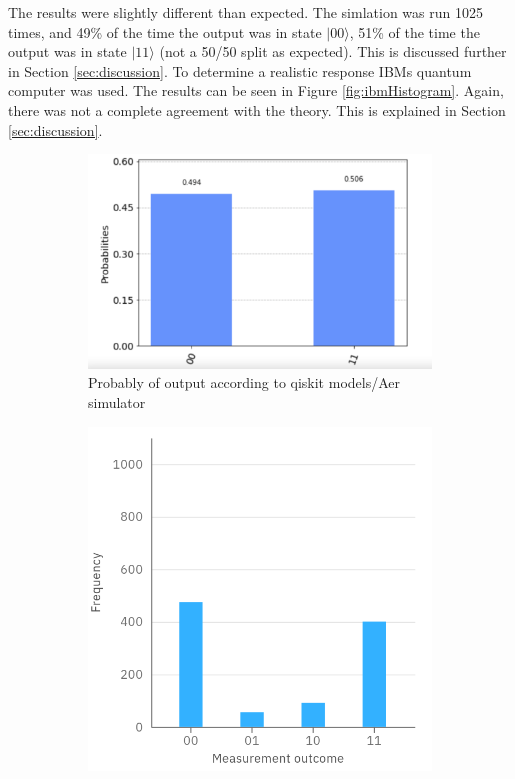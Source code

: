 The results were slightly different than expected. The simlation was run 1025 times, and 49\% of the time the output was in state $|00\rangle$, 51\% of the time the output was in state $|11\rangle$ (not a 50/50 split as expected). This is discussed further in Section \ref{sec:discussion}. To determine a realistic response IBMs quantum computer was used. The results can be seen in Figure \ref{fig:ibmHistogram}. Again, there was not a complete agreement with the theory. This is explained in Section \ref{sec:discussion}.

\begin{figure}[h]
    \centering
    \begin{subfigure}[h]{0.5\textwidth}
        \includegraphics[width=\textwidth]{lab2/images/qiskitHistogram.png}
        \caption{Probably of output according to qiskit models/Aer simulator} 
        \label{fig:qiskitHistogram}
    \end{subfigure}
    \hfill
    \begin{subfigure}[h]{0.43\textwidth}
        \includegraphics[width=\textwidth]{lab2/images/ibmHistogram.png}

\end{subfigure}
\end{figure}
